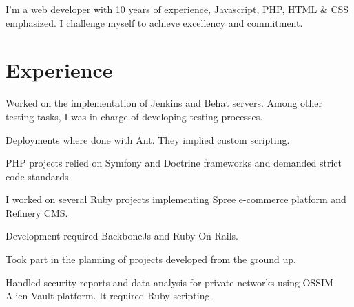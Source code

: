 \documentclass[]{deedy-resume-openfont}
\begin{document}
\begin{minipage}[t]{0.66\textwidth}

\vspace{\topsep}

{\Large I'm a web developer with 10 years of experience, Javascript, PHP, HTML \& CSS emphasized. I challenge myself to achieve excellency and commitment.}

\hrulefill


\section{Experience}


\begin{tightemize}
\item Worked on the implementation of Jenkins and Behat servers. Among other testing tasks, I was in charge of developing testing processes.
\item Deployments where done with Ant. They implied custom scripting.
\item PHP projects relied on Symfony and Doctrine frameworks and demanded strict code standards.
\end{tightemize}

\sectionsep



\begin{tightemize}
\item I worked on several Ruby projects implementing Spree e-commerce platform and Refinery CMS.
\item Development required BackboneJs and Ruby On Rails.
\item Took part in the planning of projects developed from the ground up.
\item Handled security reports and data analysis for private networks using OSSIM Alien Vault platform. It required Ruby scripting.
\end{tightemize}

\sectionsep



\end{minipage}
\end{document}

